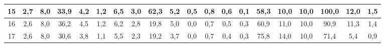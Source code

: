 \begin{sidewaystable}[]
\begin{tabular}{|c|c|c|c|c|c|c|c|c|c|c|c|c|c|c|c|c|c|c|c|}
    15 & 2,7                                              & 8,0                                              & 33,9                                             & 4,2                                              & 1,2                                              & 6,5                                              & 3,0                                              & 62,3                                             & 5,2                                              & 0,5                                              & 0,8                                              & 0,6                                              & 0,1                                              & 58,3                                            & 10,0                                            & 10,0                                            & 100,0                                           & 12,0                                            & 1,5                                             \\ \hline
    16 & 2,6                                              & 8,0                                              & 36,2                                             & 4,5                                              & 1,2                                              & 6,2                                              & 2,8                                              & 19,8                                             & 5,0                                              & 0,0                                              & 0,7                                              & 0,5                                              & 0,3                                              & 60,9                                            & 11,0                                            & 10,0                                            & 90,9                                            & 11,3                                            & 1,4                                             \\ \hline
    17 & 2,6                                              & 8,0                                              & 30,6                                             & 3,8                                              & 1,1                                              & 5,5                                              & 2,3                                              & 19,2                                             & 3,7                                              & 0,0                                              & 0,7                                              & 0,4                                              & 0,3                                              & 75,8                                            & 14,0                                            & 10,0                                            & 71,4                                            & 5,4                                             & 0,9                                             \\ \hline

\end{tabular}
\end{sidewaystable}
